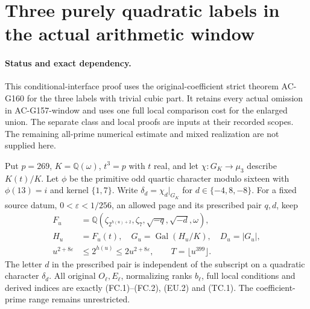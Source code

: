 \section{Three purely quadratic labels in the actual arithmetic window}
\label{sec:pure-quadratic-actual-window}

\paragraph{Status and exact dependency.}
This conditional-interface proof uses the original-coefficient
strict theorem AC-G160 for the three labels with trivial cubic part.
It retains every actual omission in AC-G157-window and uses one
full local comparison cost for the enlarged union.
The separate class and local proofs are inputs at their recorded
scopes.  The remaining all-prime numerical estimate and mixed
realization are not supplied here.

Put $p=269$, $K=\mathbb Q(\omega)$, $t^3=p$ with $t$ real,
and let $\chi:G_K\to\mu_3$ describe $K(t)/K$.
Let $\phi$ be the primitive odd quartic character modulo sixteen
with $\phi(13)=i$ and kernel $\{1,7\}$.
Write $\delta_d=\chi_d|_{G_K}$ for $d\in\{-4,8,-8\}$.
For a fixed source datum, $0<\varepsilon<1/256$, an allowed
page and its prescribed pair $q,d$, keep
\[
 \begin{aligned}
 F_u&=\mathbb Q(\zeta_{2^{h(u)+2}},\zeta_7,
                          \sqrt{-q},\sqrt{-d},\omega),\\
 H_u&=F_u(t),\quad G_u=\operatorname{Gal}(H_u/K),\quad D_u=|G_u|,\\
 u^{2+8\varepsilon}&\leq2^{h(u)}\leq2u^{2+8\varepsilon},
                         \qquad T=\lfloor u^{399}\rfloor.
 \end{aligned}
 \tag{Q0W.1}
\]
The letter $d$ in the prescribed pair is independent of the
subscript on a quadratic character $\delta_d$.
All original $O_\ell,E_\ell$, normalizing ranks $b_\ell$,
full local conditions and derived indices are exactly
(FC.1)--(FC.2), (EU.2) and (TC.1).
The coefficient-prime range remains unrestricted.

